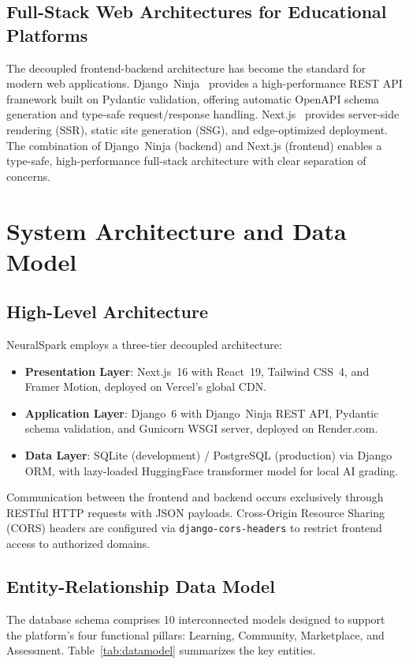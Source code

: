 \documentclass[conference]{IEEEtran}
\begin{document}
\subsection{Full-Stack Web Architectures for Educational Platforms}
The decoupled frontend-backend architecture has become the standard for modern web applications. Django~Ninja~\cite{django_ninja} provides a high-performance REST API framework built on Pydantic validation, offering automatic OpenAPI schema generation and type-safe request/response handling. Next.js~\cite{nextjs} provides server-side rendering (SSR), static site generation (SSG), and edge-optimized deployment. The combination of Django~Ninja (backend) and Next.js (frontend) enables a type-safe, high-performance full-stack architecture with clear separation of concerns.

\section{System Architecture and Data Model}

\subsection{High-Level Architecture}
NeuralSpark employs a three-tier decoupled architecture:
\begin{itemize}[leftmargin=*]
    \item \textbf{Presentation Layer}: Next.js~16 with React~19, Tailwind CSS~4, and Framer Motion, deployed on Vercel's global CDN.
    \item \textbf{Application Layer}: Django~6 with Django~Ninja REST API, Pydantic schema validation, and Gunicorn WSGI server, deployed on Render.com.
    \item \textbf{Data Layer}: SQLite (development) / PostgreSQL (production) via Django ORM, with lazy-loaded HuggingFace transformer model for local AI grading.
\end{itemize}

Communication between the frontend and backend occurs exclusively through RESTful HTTP requests with JSON payloads. Cross-Origin Resource Sharing (CORS) headers are configured via \texttt{django-cors-headers} to restrict frontend access to authorized domains.

\subsection{Entity-Relationship Data Model}
The database schema comprises 10 interconnected models designed to support the platform's four functional pillars: Learning, Community, Marketplace, and Assessment. Table~\ref{tab:datamodel} summarizes the key entities.
\end{document}
